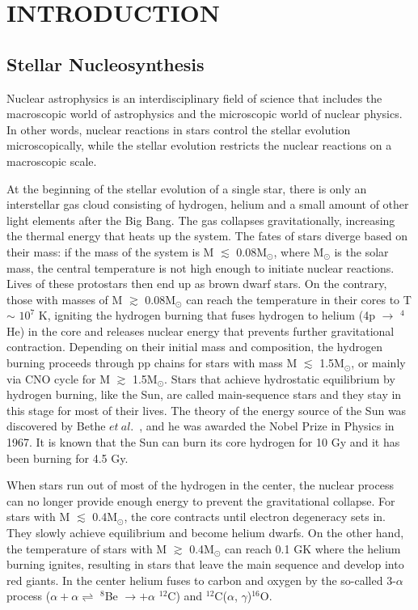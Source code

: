 
%

\chapter{INTRODUCTION}

\section{Stellar Nucleosynthesis}
Nuclear astrophysics is an interdisciplinary field of science that includes the macroscopic world of astrophysics and the microscopic world of nuclear physics.  In other words, nuclear reactions in stars control the stellar evolution microscopically, while the stellar evolution restricts the nuclear reactions on a macroscopic scale.


 At the beginning of the stellar evolution of a single star, there is only an interstellar gas cloud consisting of hydrogen, helium and a small amount of other light elements after the Big Bang. The gas collapses gravitationally, increasing the thermal energy that heats up the system. The fates of stars diverge based on their mass:  if the mass of the system is M $\lesssim$ 0.08M$_\odot$, where M$_\odot$ is the solar mass, the central temperature is not high enough to initiate nuclear reactions. Lives of these protostars then end up as brown dwarf stars.  On the contrary, those with masses of M $\gtrsim$ 0.08M$_\odot$ can reach the temperature in their cores to  T $\sim$ $10^7$ K, igniting  the hydrogen burning that fuses hydrogen to helium (4p $\rightarrow$ $^4$He) in the core and releases nuclear energy that  prevents further gravitational contraction. Depending on their initial mass and composition, the hydrogen burning proceeds through pp chains for stars with mass M $\lesssim$ 1.5M$_\odot$, or mainly via CNO cycle for M $\gtrsim$ 1.5M$_\odot$.  Stars that achieve hydrostatic equilibrium by  hydrogen burning, like the Sun, are called main-sequence stars and they stay in this stage for most of their lives. The theory of the energy source of the Sun was discovered by Bethe $et\ al.$~\citep{Bethe1939}, and he was awarded the Nobel Prize in Physics in 1967. It is known that the Sun can burn its core hydrogen for 10 Gy and it has been burning for 4.5 Gy.

When stars run out of most of the hydrogen in the center, the nuclear process can no longer provide enough energy to prevent the gravitational collapse. For stars with M $\lesssim$ 0.4M$_\odot$, the core contracts until  electron degeneracy sets in. They slowly achieve  equilibrium  and become  helium dwarfs. On the other hand,  the temperature of stars  with  M $\gtrsim$ 0.4M$_\odot$ can  reach  0.1 GK where the helium burning ignites, resulting in stars that leave the main sequence and develop into red giants.  In the center helium fuses to carbon and oxygen by the so-called 3-$\alpha$ process ($\alpha + \alpha \rightleftharpoons$ $^8$Be $\rightarrow + \alpha$ $^{12}$C) and $^{12}$C($\alpha$, $\gamma$)$^{16}$O.


